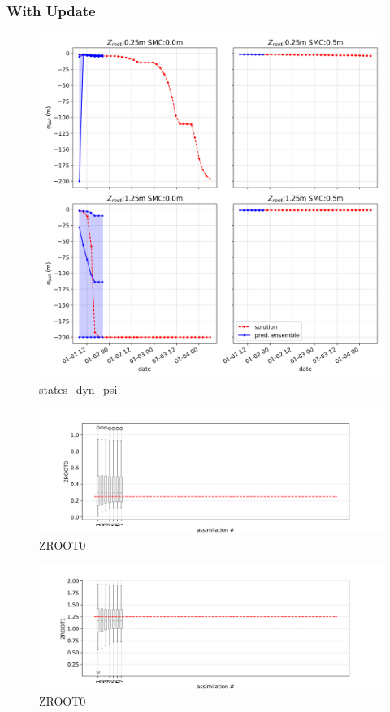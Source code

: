 \documentclass{article}
\begin{document}
\subsubsection{With Update}

\begin{figure}[!htbp]
\centering
\includegraphics[width=0.75\linewidth]{files/states_dyn_psi-497f8e21155b6be00d8c34fca745139b.png}
\caption[]{states\_dyn\_psi}
\label{states_dyn_psi}
\end{figure}

\begin{figure}[!htbp]
\centering
\includegraphics[width=0.75\linewidth]{files/ZROOT0-ce5733aa3f0f117411219fc58d49efb9.png}
\caption[]{ZROOT0}
\label{ZROOT0}
\end{figure}

\begin{figure}[!htbp]
\centering
\includegraphics[width=0.75\linewidth]{files/ZROOT1-f9256fae2e44499ee733dbcf8297b225.png}
\caption[]{ZROOT0}
\label{ZROOT1}
\end{figure}
\end{document}
